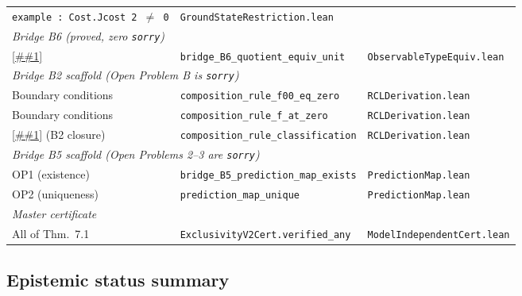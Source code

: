 \documentclass[11pt]{article}
\providecommand{\cref}[1]{\ref{##1}}%
\theoremstyle{definition}
\theoremstyle{remark}
\begin{document}
\begin{center}
\begin{tabular}{p{3.4cm}p{3.2cm}p{5.0cm}}
  \texttt{example : Cost.Jcost 2 $\neq$ 0} &
  \texttt{GroundStateRestriction.lean} \\[4pt]
\multicolumn{3}{l}{\textit{Bridge B6 (proved, zero \texttt{sorry})}} \\
\cref{sec:bridge-b6} &
  \texttt{bridge\_B6\_quotient\_equiv\_unit} &
  \texttt{ObservableTypeEquiv.lean} \\[4pt]
\multicolumn{3}{l}{\textit{Bridge B2 scaffold (Open Problem B is \texttt{sorry})}} \\
Boundary conditions &
  \texttt{composition\_rule\_f00\_eq\_zero} &
  \texttt{RCLDerivation.lean} \\
Boundary conditions &
  \texttt{composition\_rule\_f\_at\_zero} &
  \texttt{RCLDerivation.lean} \\
\cref{thm:b2-closure} (B2 closure) &
  \texttt{composition\_rule\_classification} &
  \texttt{RCLDerivation.lean} \\[4pt]
\multicolumn{3}{l}{\textit{Bridge B5 scaffold (Open Problems 2--3 are \texttt{sorry})}} \\
OP1 (existence) &
  \texttt{bridge\_B5\_prediction\_map\_exists} &
  \texttt{PredictionMap.lean} \\
OP2 (uniqueness) &
  \texttt{prediction\_map\_unique} &
  \texttt{PredictionMap.lean} \\[4pt]
\multicolumn{3}{l}{\textit{Master certificate}} \\
All of Thm.~7.1 & \texttt{ExclusivityV2Cert.verified\_any} &
  \texttt{ModelIndependentCert.lean} \\
\hline
\end{tabular}
\end{center}

\subsection*{Epistemic status summary}
\end{document}

